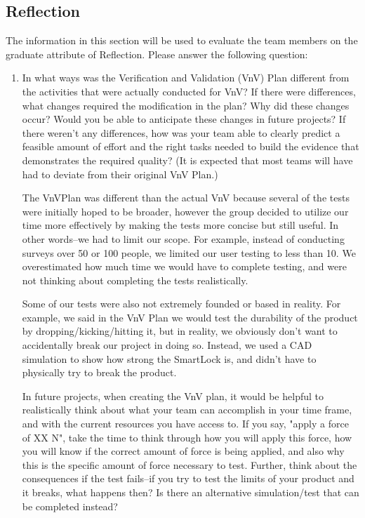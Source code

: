 \documentclass[12pt, titlepage]{article}
\begin{document}
\subsection{Reflection}

The information in this section will be used to evaluate the team members on the
graduate attribute of Reflection.  Please answer the following question:

\begin{enumerate}
  \item In what ways was the Verification and Validation (VnV) Plan different
  from the activities that were actually conducted for VnV?  If there were
  differences, what changes required the modification in the plan?  Why did
  these changes occur?  Would you be able to anticipate these changes in future
  projects?  If there weren't any differences, how was your team able to clearly
  predict a feasible amount of effort and the right tasks needed to build the
  evidence that demonstrates the required quality?  (It is expected that most
  teams will have had to deviate from their original VnV Plan.)
  
  The VnVPlan was different than the actual VnV because several of the tests were initially hoped to be broader, however the group decided to utilize our time more effectively by making the tests more concise but still useful. In other words--we had to limit our scope. For example, instead of conducting surveys over 50 or 100 people, we limited our user testing to less than 10. We overestimated how much time we would have to complete testing, and were not thinking about completing the tests realistically. 

Some of our tests were also not extremely founded or based in reality. For example, we said in the VnV Plan we would test the durability of the product by dropping/kicking/hitting it, but in reality, we obviously don't want to accidentally break our project in doing so. Instead, we used a CAD simulation to show how strong the SmartLock is, and didn't have to physically try to break the product. 

In future projects, when creating the VnV plan, it would be helpful to realistically think about what your team can accomplish in your time frame, and with the current resources you have access to. If you say, "apply a force of XX N", take the time to think through how you will apply this force, how you will know if the correct amount of force is being applied, and also why this is the specific amount of force necessary to test. Further, think about the consequences if the test fails--if you try to test the limits of your product and it breaks, what happens then? Is there an alternative simulation/test that can be completed instead?
\end{enumerate}
\end{document}
